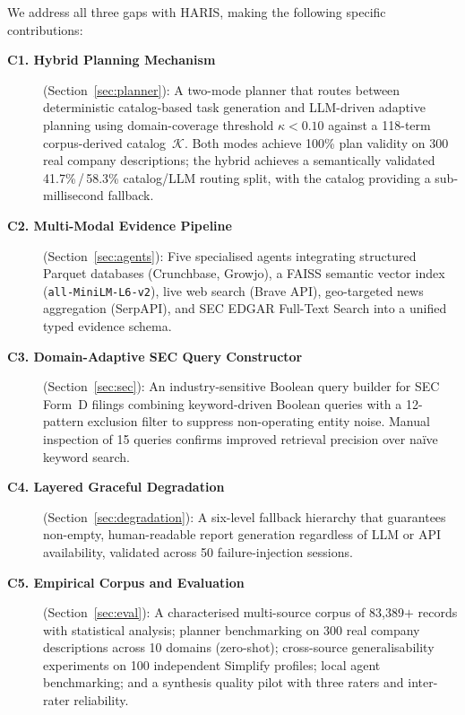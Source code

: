 \documentclass[preprint,12pt]{elsarticle}
\newcommand{\calK}{\mathcal{K}}
\begin{document}
We address all three gaps with HARIS, making the following specific
contributions:

\begin{description}
  \item[\textbf{C1. Hybrid Planning Mechanism}] (Section~\ref{sec:planner}):
    A two-mode planner that routes between deterministic catalog-based task
    generation and LLM-driven adaptive planning using domain-coverage threshold
    $\kappa < 0.10$ against a 118-term corpus-derived catalog~$\calK$.
    Both modes achieve 100\% plan validity on 300 real company descriptions;
    the hybrid achieves a semantically validated 41.7\%\,/\,58.3\% catalog/LLM
    routing split, with the catalog providing a sub-millisecond fallback.

  \item[\textbf{C2. Multi-Modal Evidence Pipeline}]
    (Section~\ref{sec:agents}): Five specialised agents integrating structured
    Parquet databases (Crunchbase, Growjo), a FAISS semantic vector index
    (\texttt{all-MiniLM-L6-v2}), live web search (Brave API), geo-targeted
    news aggregation (SerpAPI), and SEC EDGAR Full-Text Search into a unified
    typed evidence schema.

  \item[\textbf{C3. Domain-Adaptive SEC Query Constructor}]
    (Section~\ref{sec:sec}): An industry-sensitive Boolean query builder for
    SEC Form~D filings combining keyword-driven Boolean queries with a
    12-pattern exclusion filter to suppress non-operating entity noise.
    Manual inspection of 15 queries confirms improved retrieval precision
    over na\"ive keyword search.

  \item[\textbf{C4. Layered Graceful Degradation}]
    (Section~\ref{sec:degradation}): A six-level fallback hierarchy that
    guarantees non-empty, human-readable report generation regardless of LLM
    or API availability, validated across 50 failure-injection sessions.

  \item[\textbf{C5. Empirical Corpus and Evaluation}]
    (Section~\ref{sec:eval}): A characterised multi-source corpus of 83,389$+$
    records with statistical analysis; planner benchmarking on 300 real company
    descriptions across 10 domains (zero-shot); cross-source generalisability
    experiments on 100 independent Simplify profiles; local agent benchmarking;
    and a synthesis quality pilot with three raters and inter-rater reliability.
\end{description}
\end{document}
